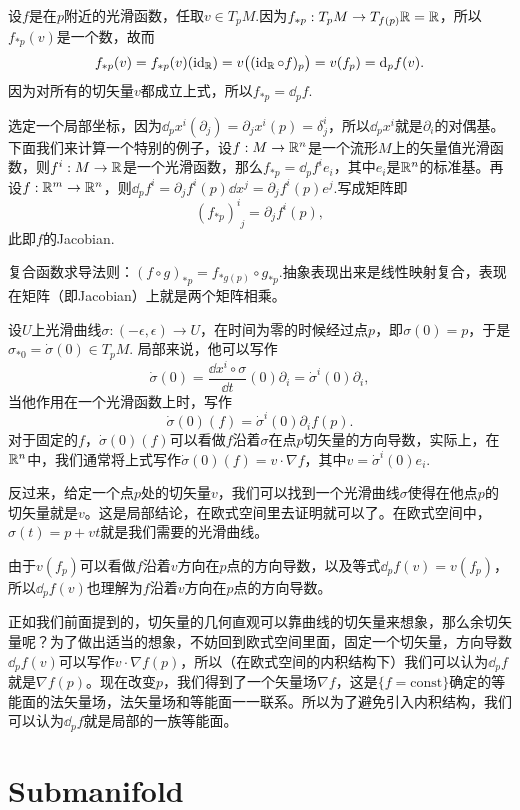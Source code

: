 \para 设$f$是在$p$附近的光滑函数，任取$v\in T_pM$.因为$f_{*p}:T_pM\to T_{f(p)}\mathbb{R}=\mathbb{R}$，所以$f_{*p}(v)$是一个数，故而
	\[
		f_{*p}(v)=f_{*p}(v)(\operatorname{id}_{\mathbb{R}})=v\bigl((\operatorname{id}_{\mathbb{R}}\circ f)_p\bigr)=v(f_p)=\mathrm{d}_p f(v).
	\]
	因为对所有的切矢量$v$都成立上式，所以$f_{*p}=\dd_p f$.

选定一个局部坐标，因为$\dd_p x^i(\partial_j)=\partial_jx^i(p)=\delta^i_j$，所以$\dd_p x^i$就是$\partial_i$的对偶基。下面我们来计算一个特别的例子，设$f:M\to \mathbb{R}^n$是一个流形$M$上的矢量值光滑函数，则$f^i:M\to \mathbb{R}$是一个光滑函数，那么$f_{*p}=\dd_pf^i e_i$，其中$e_i$是$\mathbb{R}^n$的标准基。再设$f:\mathbb{R}^m\to \mathbb{R}^n$，则$\dd_pf^i=\partial_j f^i(p) \dd x^j=\partial_j f^i(p) e^j$.写成矩阵即
\[
	(f_{*p})^{i}_{\phantom{i}j}=\partial_j f^i(p),
\]
此即$f$的Jacobian.

\para 复合函数求导法则：$(f\circ g)_{*p}=f_{*g(p)}\circ g_{*p}$.抽象表现出来是线性映射复合，表现在矩阵（即Jacobian）上就是两个矩阵相乘。

\para 设$U$上光滑曲线$\sigma:(-\epsilon,\epsilon)\to U$，在时间为零的时候经过点$p$，即$\sigma(0)=p$，于是$\sigma_{*0}=\dot\sigma(0)\in T_pM$. 局部来说，他可以写作
\[
	\dot{\sigma}(0)=\frac{\dd x^i\circ \sigma}{\dd t}(0)\partial_i=\dot \sigma^i(0)\partial_i,
\]
当他作用在一个光滑函数上时，写作
\[
	\dot{\sigma}(0)(f)=\dot \sigma^i(0)\partial_if(p).
\]
对于固定的$f$，$\dot{\sigma}(0)(f)$可以看做$f$沿着$\sigma$在点$p$切矢量的方向导数，实际上，在$\mathbb{R}^n$中，我们通常将上式写作$\dot{\sigma}(0)(f)=v\cdot \nabla f$，其中$v=\dot \sigma^i(0)e_i$.

反过来，给定一个点$p$处的切矢量$v$，我们可以找到一个光滑曲线$\sigma$使得在他点$p$的切矢量就是$v$。这是局部结论，在欧式空间里去证明就可以了。在欧式空间中，$\sigma(t)=p+vt$就是我们需要的光滑曲线。

\para 由于$v(f_p)$可以看做$f$沿着$v$方向在$p$点的方向导数，以及等式$\dd_pf(v)=v(f_p)$，所以$\dd_pf(v)$也理解为$f$沿着$v$方向在$p$点的方向导数。

正如我们前面提到的，切矢量的几何直观可以靠曲线的切矢量来想象，那么余切矢量呢？为了做出适当的想象，不妨回到欧式空间里面，固定一个切矢量，方向导数$\dd_pf(v)$可以写作$v\cdot \nabla f(p)$，所以（在欧式空间的内积结构下）我们可以认为$\dd_pf$就是$\nabla f(p)$。现在改变$p$，我们得到了一个矢量场$\nabla f$，这是$\{f=\text{const}\}$确定的等能面的法矢量场，法矢量场和等能面一一联系。所以为了避免引入内积结构，我们可以认为$\dd_pf$就是局部的一族等能面。

\section{Submanifold}

